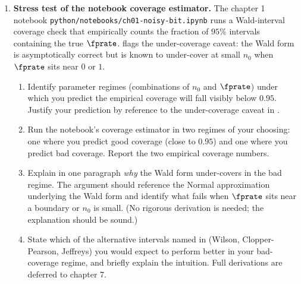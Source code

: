 \begin{enumerate}
\item \exstarstarstar
\label{ex:ch1-11}
\textbf{Stress test of the notebook coverage estimator.}
The chapter 1 notebook \texttt{python/notebooks/ch01-noisy-bit.ipynb}
runs a Wald-interval coverage check that empirically counts the
fraction of $95\%$ intervals containing the true $\fprate$.  flags the under-coverage caveat:
the Wald form is asymptotically correct but is known to under-cover at
small $n_0$ when $\fprate$ sits near $0$ or $1$.
\begin{enumerate}
  \item[(a)] Identify parameter regimes (combinations of $n_0$ and
    $\fprate$) under which you predict the empirical coverage will fall
    visibly below $0.95$. Justify your prediction by reference to the
    under-coverage caveat in .
  \item[(b)] Run the notebook's coverage estimator in two regimes of
    your choosing: one where you predict good coverage (close to $0.95$)
    and one where you predict bad coverage. Report the two empirical
    coverage numbers.
  \item[(c)] Explain in one paragraph \emph{why} the Wald form
    under-covers in the bad regime. The argument should reference the
    Normal approximation underlying the Wald form and identify what
    fails when $\fprate$ sits near a boundary or $n_0$ is small. (No
    rigorous derivation is needed; the explanation should be sound.)
  \item[(d)] State which of the alternative intervals named in
     (Wilson, Clopper-Pearson, Jeffreys) you
    would expect to perform better in your bad-coverage regime, and
    briefly explain the intuition. Full derivations are deferred to
    chapter 7.
\end{enumerate}

\end{enumerate}
